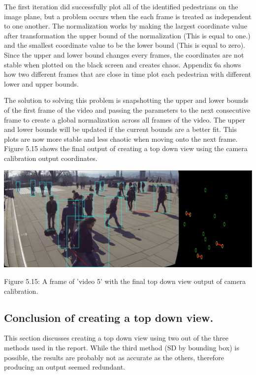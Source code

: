 \documentclass[12pt]{report}
\begin{document}
\vspace{2mm}

The first iteration did successfully plot all of the identified pedestrians on the image plane, but a problem occurs when the each frame is treated as independent to one another. The normalization works by making the largest coordinate value after transformation the upper bound of the normalization (This is equal to one.) and the smallest coordinate value to be the lower bound (This is equal to zero). Since the upper and lower bound changes every frames, the coordinates are not stable when plotted on the black screen and creates chaos. Appendix 6a shows how two different frames that are close in time plot each pedestrian with different lower and upper bounds.

\vspace{2mm}

The solution to solving this problem is snapshotting the upper and lower bounds of the first frame of the video and passing the parameters to the next consecutive frame to create a global normalization across all frames of the video. The upper and lower bounds will be updated if the current bounds are a better fit. This plots are now more stable and less chaotic when moving onto the next frame. Figure 5.15 shows the final output of creating a top down view using the camera calibration output coordinates.

\begin{center}
	\includegraphics[width=150mm]{./images/appendix/Stable.JPG}
	
	{\footnotesize Figure 5.15: A frame of 'video 5' with the final top down view output of camera calibration.}
\end{center}

\subsection*{Conclusion of creating a top down view.}

This section discusses creating a top down view using two out of the three methods used in the report. While the third method (SD by bounding box) is possible, the results are probably not as accurate as the others, therefore producing an output seemed redundant.
\end{document}
